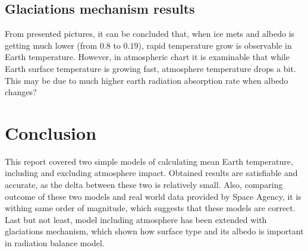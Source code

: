 \documentclass[onecolumn]{article}
\begin{document}
\noindent{}
\noindent{}

\subsection{Glaciations mechanism results}
From presented pictures, it can be concluded that, when ice mets and albedo is getting much lower (from $0.8$ to $0.19$), rapid temperature grow is observable in Earth temperature. However, in atmospheric chart it is examinable that while Earth surface temperature is growing fast, atmosphere temperature drops a bit. This may be due to much higher earth radiation absorption rate when albedo changes? 


\section{Conclusion}
This report covered two simple models of calculating mean Earth temperature, including and excluding atmosphere impact. Obtained results are satisfiable and accurate, as the delta between these two is relatively small. Also, comparing outcome of these two models and real world data provided by Space Agency, it is withing same order of magnitude, which suggests that these models are correct.
Last but not least, model including atmosphere has been extended with glaciations mechanism, which shown how surface type and its albedo is important in radiation balance model. 
\end{document}
